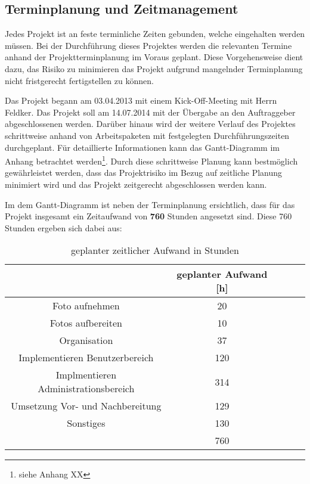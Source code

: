 \subsection{Terminplanung und Zeitmanagement}
\label{sec:TerminplanungUndZeitManagement}

Jedes Projekt ist an feste terminliche Zeiten gebunden, welche eingehalten werden müssen. Bei der Durchführung dieses 
Projektes werden die relevanten Termine anhand der Projektterminplanung im Voraus geplant. Diese Vorgehensweise 
dient dazu, das Risiko zu minimieren das Projekt aufgrund mangelnder Terminplanung nicht fristgerecht fertigstellen zu 
können.

Das Projekt begann am 03.04.2013 mit einem Kick-Off-Meeting mit Herrn Feldker. Das Projekt 
soll am 14.07.2014 mit der Übergabe an den Auftraggeber abgeschlossenen werden. Darüber hinaus wird 
der weitere Verlauf des Projektes schrittweise anhand von 
Arbeitspaketen mit festgelegten Durchführungszeiten durchgeplant. Für detaillierte Informationen kann das Gantt-Diagramm 
im Anhang betrachtet werden\footnote{siehe Anhang XX}.
Durch diese schrittweise Planung kann bestmöglich gewährleistet werden, dass das  Projektrisiko im Bezug auf zeitliche 
Planung minimiert wird und das Projekt zeitgerecht abgeschlossen werden kann.

Im dem Gantt-Diagramm ist neben der Terminplanung ersichtlich, dass für das Projekt insgesamt ein Zeitaufwand von
\textbf{760} Stunden angesetzt sind. Diese 760 Stunden ergeben sich dabei aus:

\clearpage
\begin{table}[h]
\centering
\begin{tabular}{ccccl}
\hline
\multicolumn{1}{l}{}                 & geplanter Aufwand {[}h{]}  \\ \hline
Foto aufnehmen                       & 20                         \\ \hline
Fotos aufbereiten                    & 10                         \\ \hline
Organisation                         & 37                         \\ \hline
Implementieren Benutzerbereich       & 120                        \\ \hline
Implmentieren Administrationsbereich & 314                        \\ \hline
Umsetzung Vor- und Nachbereitung     & 129                        \\ \hline
Sonstiges                            & 130                        \\ \hline
                                     & 760                        \\ \hline
\end{tabular}
\caption{geplanter zeitlicher Aufwand in Stunden}%
\label{tab:geplanterAufwand}%
\end{table}